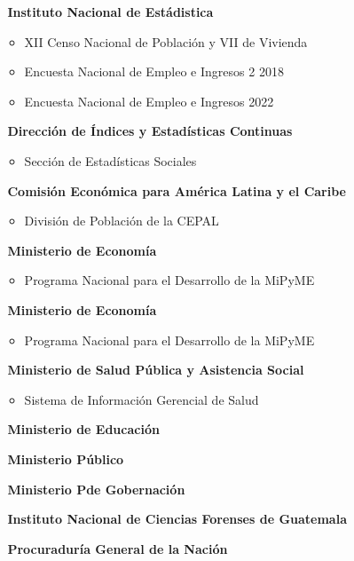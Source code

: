 \newpage
	\begin{itemize}
		\item[$ $] \textbf{Instituto Nacional de Estádistica}
		\begin{itemize}
			\item	XII Censo Nacional de Población y VII de Vivienda 
			\item	Encuesta Nacional de Empleo e Ingresos 2 2018
			\item	Encuesta Nacional de Empleo e Ingresos 2022
		\end{itemize}
		\item[$ $] \textbf{Dirección de Índices y Estadísticas Continuas}
		\begin{itemize}
			\item	Sección de Estadísticas Sociales
		\end{itemize}
		\item[$ $] \textbf{Comisión Económica para América Latina y el Caribe}
		\begin{itemize}
			\item	División de Población de la CEPAL
		\end{itemize}
		\item[$ $] \textbf{Ministerio de Economía}
		\begin{itemize}
			\item	Programa Nacional para el Desarrollo de la MiPyME
		\end{itemize}
		\item[$ $] \textbf{Ministerio de Economía}
		\begin{itemize}
			\item	Programa Nacional para el Desarrollo de la MiPyME
		\end{itemize}	
		\item[$ $] \textbf{Ministerio de Salud Pública y Asistencia Social}
		\begin{itemize}
			\item	Sistema de Información Gerencial de Salud		
		\end{itemize}
		\item[$ $] \textbf{Ministerio de Educación}
		\item[$ $] \textbf{Ministerio Público}
		\item[$ $] \textbf{Ministerio Pde Gobernación}
		\item[$ $] \textbf{Instituto Nacional de Ciencias Forenses de Guatemala}	
		\item[$ $] \textbf{Procuraduría General de la Nación}
		\begin{itemize}

\end{itemize}
\end{itemize}
